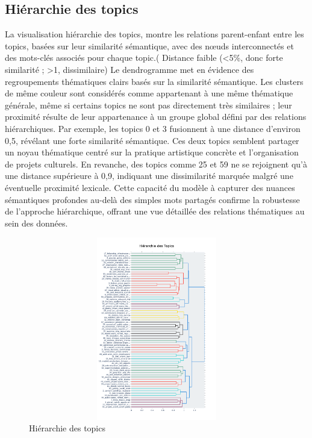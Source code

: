 \documentclass[mstat,12pt]{unswthesis}
\begin{document}
\subsection{Hiérarchie des topics}

La visualisation hiérarchie des topics, montre les relations parent-enfant entre les topics, 
basées sur leur similarité sémantique, avec des nœuds interconnectés et des mots-clés associés 
pour chaque topic.( Distance faible (<5\%, donc forte similarité ; >1, dissimilaire)  
Le dendrogramme met en évidence des regroupements thématiques clairs basés sur la 
similarité sémantique. Les clusters de même couleur sont considérés comme appartenant à 
une même thématique générale, même si certains topics ne sont pas directement très 
similaires ; leur proximité résulte de leur appartenance à un groupe global défini par des 
relations hiérarchiques. Par exemple, les topics 0 et 3 fusionnent à une distance d’environ 0,5, 
révélant une forte similarité sémantique. Ces deux topics semblent partager un noyau 
thématique centré sur la pratique artistique concrète et l’organisation de projets culturels. En 
revanche, des topics comme 25 et 59 ne se rejoignent qu’à une distance supérieure à 0,9, 
indiquant une dissimilarité marquée malgré une éventuelle proximité lexicale. Cette capacité 
du modèle à capturer des nuances sémantiques profondes au-delà des simples mots partagés 
confirme la robustesse de l’approche hiérarchique, offrant une vue détaillée des relations 
thématiques au sein des données.


\begin{figure}[H]
    \centering
    \includegraphics[width=14cm,height=8cm]{Hierachy.png}
    \caption{Hiérarchie des topics }
    \label{fig:enquete}
\end{figure}
\end{document}
